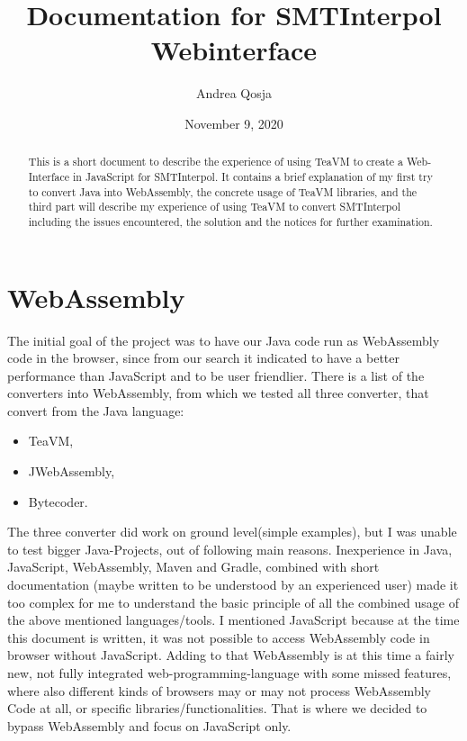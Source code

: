 \documentclass[12pt]{article}
\title{Documentation for SMTInterpol Webinterface}
\author{Andrea Qosja}
\date{November 9, 2020}
\begin{document}
\maketitle

\begin{abstract}
This is a short document to describe the experience of using TeaVM to create a Web-Interface in JavaScript for SMTInterpol.
It contains a brief explanation of my first try to convert Java into WebAssembly, the concrete usage of TeaVM libraries, and the third part will describe my experience of using TeaVM to convert SMTInterpol including the issues encountered, the solution and the notices for further examination.
\end{abstract}

\section{WebAssembly}

The initial goal of the project was to have our Java code run as WebAssembly code in the browser, since from our search it indicated to have a better performance than JavaScript and to be user friendlier. There is a list\cite{1} of the converters into WebAssembly, from which we tested all three converter, that convert from the Java language:
\begin{itemize}
\item TeaVM,
\item JWebAssembly,
\item Bytecoder.
\end{itemize}

The three converter did work on ground level(simple examples), but I was unable to test bigger Java-Projects, out of following main reasons.
Inexperience in Java, JavaScript, WebAssembly, Maven and Gradle,
combined with short documentation (maybe written to be understood by an experienced user) made it too complex for me to understand the basic principle of all the combined usage of the above mentioned languages/tools. I mentioned JavaScript because at the time this document is written, it was not possible to access WebAssembly code in browser without JavaScript. Adding to that WebAssembly is at this time a fairly new, not fully integrated web-programming-language with some missed features, where also different kinds of browsers may or may not process WebAssembly Code at all, or specific libraries/functionalities. That is where we decided to bypass WebAssembly and focus on JavaScript only.
\end{document}

